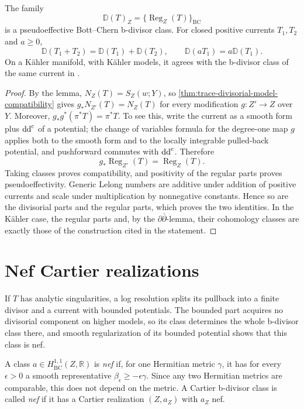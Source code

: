 \begin{theorem}\label{thm:closed-current-bclass}
The family
\[
 \mathbb D(T)_Z=\{\operatorname{Reg}_Z(T)\}_{\mathrm{BC}}
\]
is a pseudoeffective Bott--Chern b-divisor class. For closed positive currents $T_1,T_2$ and $a\geq0$,
\[
 \mathbb D(T_1+T_2)=\mathbb D(T_1)+\mathbb D(T_2),
 \qquad \mathbb D(aT_1)=a\mathbb D(T_1).
\]
On a K\"ahler manifold, with K\"ahler models, it agrees with the b-divisor class of the same current in \cite[Section~11.1.2]{SGPT}.
\end{theorem}
\begin{proof}
By the lemma, $N_Z(T)=S_Z(w;Y)$, so \cref{thm:trace-divisorial-model-compatibility} gives $g_*N_{Z'}(T)=N_Z(T)$ for every modification $g\colon Z'\to Z$ over $Y$. Moreover, $g_*g^*(\pi^*T)=\pi^*T$. To see this, write the current as a smooth form plus $\mathrm{dd}^{\mathrm{c}}$ of a potential; the change of variables formula for the degree-one map $g$ applies both to the smooth form and to the locally integrable pulled-back potential, and pushforward commutes with $\mathrm{dd}^{\mathrm{c}}$. Therefore
\[
 g_*\operatorname{Reg}_{Z'}(T)=\operatorname{Reg}_Z(T).
\]
Taking classes proves compatibility, and positivity of the regular parts proves pseudoeffectivity. Generic Lelong numbers are additive under addition of positive currents and scale under multiplication by nonnegative constants. Hence so are the divisorial parts and the regular parts, which proves the two identities. In the K\"ahler case, the regular parts and, by the $\partial\bar\partial$-lemma, their cohomology classes are exactly those of the construction cited in the statement.
\end{proof}

\section{Nef Cartier realizations}\label{sec:nef-cartier-realizations}

If $T$ has analytic singularities, a log resolution splits its pullback into a finite divisor and a current with bounded potentials. The bounded part acquires no divisorial component on higher models, so its class determines the whole b-divisor class there, and smooth regularization of its bounded potential shows that this class is nef.

A class $a\in H^{1,1}_{\mathrm{BC}}(Z,\mathbb R)$ is \emph{nef} if, for one Hermitian metric $\gamma$, it has for every $\epsilon>0$ a smooth representative $\beta_\epsilon\geq-\epsilon\gamma$. Since any two Hermitian metrics are comparable, this does not depend on the metric. A Cartier b-divisor class is called \emph{nef} if it has a Cartier realization $(Z,a_Z)$ with $a_Z$ nef.

